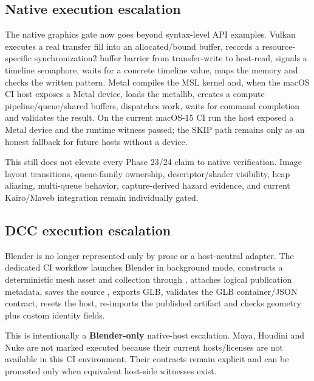 \subsection{Native execution escalation}\label{appendix-2358b21a702d-native-execution-escalation}

\hypertarget{appendix-2358b21a702d-native-execution-escalation}{}

The native graphics gate now goes beyond syntax-level API examples. Vulkan executes a real transfer fill into an allocated/bound buffer, records a resource-specific synchronization2 buffer barrier from transfer-write to host-read, signals a timeline semaphore, waits for a concrete timeline value, maps the memory and checks the written pattern. Metal compiles the MSL kernel and, when the macOS CI host exposes a Metal device, loads the metallib, creates a compute pipeline/queue/shared buffers, dispatches work, waits for command completion and validates the result. On the current macOS-15 CI run the host exposed a Metal device and the runtime witness passed; the SKIP path remains only as an honest fallback for future hosts without a device.

This still does not elevate every Phase 23/24 claim to native verification. Image layout transitions, queue-family ownership, descriptor/shader visibility, heap aliasing, multi-queue behavior, capture-derived hazard evidence, and current Kairo/Maveb integration remain individually gated.

\subsection{DCC execution escalation}\label{appendix-2358b21a702d-dcc-execution-escalation}

\hypertarget{appendix-2358b21a702d-dcc-execution-escalation}{}

Blender is no longer represented only by prose or a host-neutral adapter. The dedicated CI workflow launches Blender in background mode, constructs a deterministic mesh asset and collection through , attaches logical publication metadata, saves the source , exports GLB, validates the GLB container/JSON contract, resets the host, re-imports the published artifact and checks geometry plus custom identity fields.

This is intentionally a \textbf{Blender-only} native-host escalation. Maya, Houdini and Nuke are not marked executed because their current hosts/licenses are not available in this CI environment. Their contracts remain explicit and can be promoted only when equivalent host-side witnesses exist.

